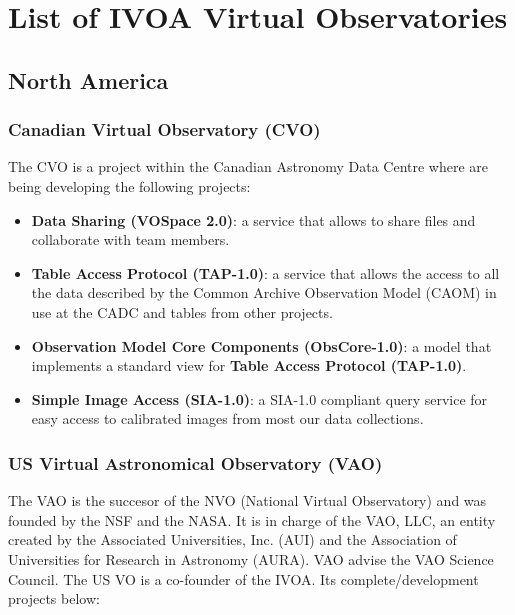 \section{List of IVOA Virtual Observatories}
\subsection{North America}
\subsubsection{Canadian Virtual Observatory (CVO)}
The CVO \cite{website:cvo-home} \nocite{SchadeDowlerDurand2004} is a project
within the Canadian Astronomy Data Centre where are being developing the
following projects:

\begin{itemize}
\item \textbf{Data Sharing (VOSpace 2.0)}:
a service that allows to share files and collaborate with team members.

\item \textbf{Table Access Protocol (TAP-1.0)}:
a service that allows the access to all the data
described by the Common Archive Observation Model (CAOM) in use at the CADC and
tables from other projects.

\item \textbf{Observation Model Core Components (ObsCore-1.0)}:
a model that implements a standard view for \textbf{Table Access Protocol
                                                    (TAP-1.0)}.

\item \textbf{Simple Image Access (SIA-1.0)}:
a SIA-1.0 compliant query service for easy access to calibrated images from most
our data collections.
\end{itemize}

\subsubsection{US Virtual Astronomical Observatory (VAO)}
The VAO \cite{website:vao-home} \nocite{DeYoung2010} is the succesor of the NVO
(National Virtual Observatory) and was founded by the NSF and the NASA. It is in
charge of the VAO, LLC, an entity created by the Associated Universities, Inc.
(AUI) and the Association of Universities for Research in Astronomy (AURA). VAO
advise the VAO Science Council. The US VO is a co-founder of the IVOA. Its
complete/development projects below:

